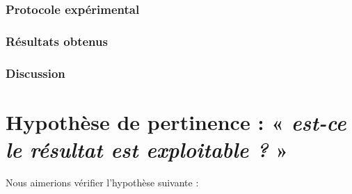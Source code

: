 			\subsubsection{Protocole expérimental}

			\subsubsection{Résultats obtenus}

			\subsubsection{Discussion}
	

    \section{Hypothèse de pertinence : « \textit{est-ce le résultat est exploitable ?} »}
	\label{section:4.4-HYPOTHESE-PERTINENCE}
	
		Nous aimerions vérifier l'hypothèse suivante :

